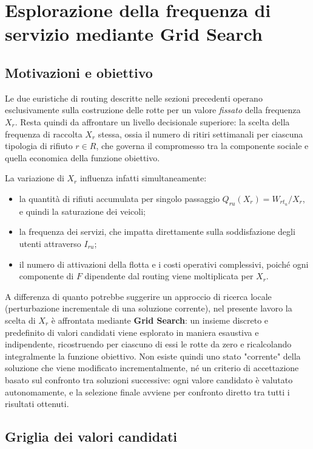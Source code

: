 \section{Esplorazione della frequenza di servizio mediante Grid Search}\label{se:grid-search}

\subsection{Motivazioni e obiettivo}

Le due euristiche di routing descritte nelle sezioni precedenti operano esclusivamente sulla costruzione delle rotte per un valore \emph{fissato} della frequenza $X_r$. Resta quindi da affrontare un livello decisionale superiore: la scelta della frequenza di raccolta $X_r$ stessa, ossia il numero di ritiri settimanali per ciascuna tipologia di rifiuto $r \in R$, che governa il compromesso tra la componente sociale e quella economica della funzione obiettivo.

La variazione di $X_r$ influenza infatti simultaneamente:
\begin{itemize}
	\item la quantità di rifiuti accumulata per singolo passaggio $Q_{ru}(X_r)=W_{r t_u}/X_r$, e quindi la saturazione dei veicoli;
	\item la frequenza dei servizi, che impatta direttamente sulla soddisfazione degli utenti attraverso $I_{ru}$;
	\item il numero di attivazioni della flotta e i costi operativi complessivi, poiché ogni componente di $F$ dipendente dal routing viene moltiplicata per $X_r$.
\end{itemize}

A differenza di quanto potrebbe suggerire un approccio di ricerca locale (perturbazione incrementale di una soluzione corrente), nel presente lavoro la scelta di $X_r$ è affrontata mediante \textbf{Grid Search}: un insieme discreto e predefinito di valori candidati viene esplorato in maniera esaustiva e indipendente, ricostruendo per ciascuno di essi le rotte da zero e ricalcolando integralmente la funzione obiettivo. Non esiste quindi uno stato "corrente" della soluzione che viene modificato incrementalmente, né un criterio di accettazione basato sul confronto tra soluzioni successive: ogni valore candidato è valutato autonomamente, e la selezione finale avviene per confronto diretto tra tutti i risultati ottenuti.

\subsection{Griglia dei valori candidati}

